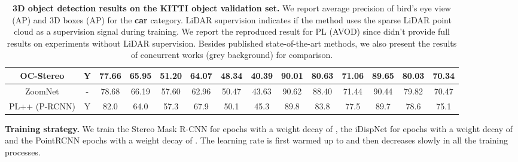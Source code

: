 \documentclass[10pt,twocolumn,letterpaper]{article}
\begin{document}
\begin{table*}
\begin{center}
{\begin{tabular}{|c||c|c|c|c||c|c|c||c|c|c||c|c|c|}
            \hline
            {\cellcolor[rgb]{0.902,0.902,0.902}} OC-Stereo& {\cellcolor[rgb]{0.902,0.902,0.902}} Y  &{\cellcolor[rgb]{0.902,0.902,0.902}} 77.66 &{\cellcolor[rgb]{0.902,0.902,0.902}} 65.95 &{\cellcolor[rgb]{0.902,0.902,0.902}} 51.20 &{\cellcolor[rgb]{0.902,0.902,0.902}} 64.07 &{\cellcolor[rgb]{0.902,0.902,0.902}} 48.34 &{\cellcolor[rgb]{0.902,0.902,0.902}} 40.39 &{\cellcolor[rgb]{0.902,0.902,0.902}} 90.01 &{\cellcolor[rgb]{0.902,0.902,0.902}} 80.63 & {\cellcolor[rgb]{0.902,0.902,0.902}}71.06 &{\cellcolor[rgb]{0.902,0.902,0.902}} 89.65 &{\cellcolor[rgb]{0.902,0.902,0.902}} 80.03 &{\cellcolor[rgb]{0.902,0.902,0.902}} 70.34 \\
            \hline
            {\cellcolor[rgb]{0.902,0.902,0.902}} ZoomNet&{\cellcolor[rgb]{0.902,0.902,0.902}}  - &{\cellcolor[rgb]{0.902,0.902,0.902}} 78.68 &{\cellcolor[rgb]{0.902,0.902,0.902}} 66.19 &{\cellcolor[rgb]{0.902,0.902,0.902}} 57.60 &{\cellcolor[rgb]{0.902,0.902,0.902}} 62.96 &{\cellcolor[rgb]{0.902,0.902,0.902}} 50.47 &{\cellcolor[rgb]{0.902,0.902,0.902}} 43.63 &{\cellcolor[rgb]{0.902,0.902,0.902}} 90.62 &{\cellcolor[rgb]{0.902,0.902,0.902}} 88.40 &{\cellcolor[rgb]{0.902,0.902,0.902}} 71.44 &{\cellcolor[rgb]{0.902,0.902,0.902}} 90.44 &{\cellcolor[rgb]{0.902,0.902,0.902}} 79.82 &{\cellcolor[rgb]{0.902,0.902,0.902}} 70.47 \\
            \hline
            {\cellcolor[rgb]{0.902,0.902,0.902}}PL++ (P-RCNN)&{\cellcolor[rgb]{0.902,0.902,0.902}}  Y  & {\cellcolor[rgb]{0.902,0.902,0.902}}82.0 &{\cellcolor[rgb]{0.902,0.902,0.902}} 64.0 & {\cellcolor[rgb]{0.902,0.902,0.902}}57.3  &{\cellcolor[rgb]{0.902,0.902,0.902}} 67.9 &{\cellcolor[rgb]{0.902,0.902,0.902}} 50.1 & {\cellcolor[rgb]{0.902,0.902,0.902}}45.3  &{\cellcolor[rgb]{0.902,0.902,0.902}} 89.8 & {\cellcolor[rgb]{0.902,0.902,0.902}}83.8 & {\cellcolor[rgb]{0.902,0.902,0.902}}77.5 &{\cellcolor[rgb]{0.902,0.902,0.902}} 89.7 &{\cellcolor[rgb]{0.902,0.902,0.902}} 78.6  &{\cellcolor[rgb]{0.902,0.902,0.902}} 75.1 \\
            \hline
            \end{tabular}
    }
    \end{center}
    \caption{
    \textbf{3D object detection results on the KITTI object validation set. }
    We report average precision of bird's eye view (AP) and 3D boxes (AP) for the \textbf{car} category.
    LiDAR supervision indicates if the method uses the sparse LiDAR point cloud as a supervision signal during training.
    We report the reproduced result for PL (AVOD) since \cite{wang2019pseudo} didn't provide full results on experiments without LiDAR supervision.
    Besides published state-of-the-art methods, we also present the results of concurrent works (grey background) for comparison.
    }
    
    \vspace{-0.3cm}
    \label{tab:kitti_val}
    \end{table*} \medskip\noindent\textbf{Training strategy.}
We train the Stereo Mask R-CNN for  epochs with a weight decay of , the iDispNet for  epochs with a weight decay of  and the PointRCNN  epochs with a weight decay of .
The learning rate is first warmed up to  and then decreases slowly in all the training processes.
\end{document}

